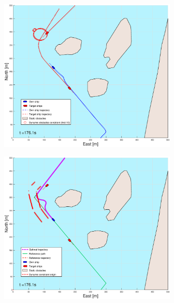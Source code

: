 \begin{figure}[ht]\ContinuedFloat
    \begin{subfigure}[b]{0.49\textwidth}
        \centering
        \includegraphics[width=\textwidth]{Images/Figures/Helloya/_Simple_0fig1_time=176}
    \end{subfigure}
    \hfill
    \begin{subfigure}[b]{0.499\textwidth}
        \centering
        \includegraphics[width=\textwidth]{Images/Figures/Helloya/_Simple_0fig999_time=176}

\end{subfigure}
\end{figure}
